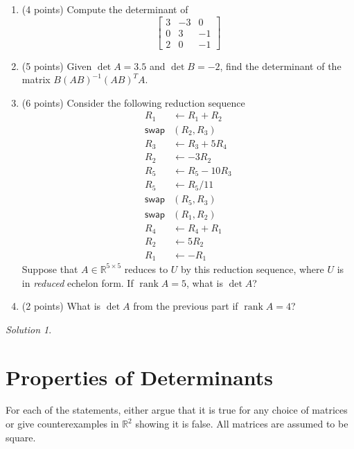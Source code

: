 \documentclass{article}
\theoremstyle{remark}
\newtheorem*{solution}{Solution}
\newcommand{\R}{\mathbb R}
\DeclareMathOperator{\rank}{rank}
\begin{document}
\begin{enumerate}
\item (4 points)
  Compute the determinant of
  \begin{displaymath}
    \begin{bmatrix}
      3 & -3 & 0 \\
      0 & 3 & -1 \\
      2 & 0 & -1
    \end{bmatrix}
  \end{displaymath}
\item (5 points) Given $\det A = 3.5$ and $\det B = -2$, find the determinant of the matrix $B(AB)^{-1}(AB)^TA$.
\item (6 points) Consider the following reduction sequence
  \begin{align*}
    R_1 &\gets R_1 + R_2 \\
    \mathsf{swap}&(R_2, R_3) \\
    R_3 &\gets R_3 + 5R_4 \\
    R_2 &\gets -3R_2 \\
    R_5 &\gets R_5 - 10R_3 \\
    R_5 &\gets R_5 / 11 \\
    \mathsf{swap}&(R_5, R_3) \\
    \mathsf{swap}&(R_1, R_2) \\
    R_4 &\gets R_4 + R_1 \\
    R_2 &\gets 5R_2 \\
    R_1 &\gets -R_1
  \end{align*}
  Suppose that $A \in \R^{5 \times 5}$ reduces to $U$ by this reduction sequence, where $U$ is in \textit{reduced} echelon form.
  If $\rank A = 5$, what is $\det A$?
\item (2 points)
  What is $\det A$ from the previous part if $\rank A = 4$?
\end{enumerate}

\medskip

\begin{solution}
\end{solution}

\pagebreak
\section{Properties of Determinants}

For each of the statements, either argue that it is true for any choice of matrices or give counterexamples in $\R^2$ showing it is false.
All matrices are assumed to be square.
\end{document}

